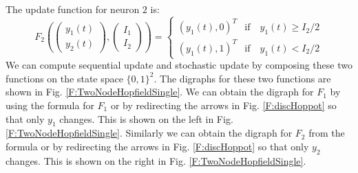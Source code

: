    The update function for neuron $2$ is:
\begin{equation}\label{E:hopexam1}
F_2
\left(
\begin{pmatrix}
y_1(t) \\ y_2(t)
\end{pmatrix},
\begin{pmatrix}
I_1 \\ I_2
\end{pmatrix}
\right)
=
\left\{
\begin{array}{ll}
(y_1(t),0)^T & \mbox{if} \quad y_1(t) \geq I_2/2 \\
(y_1(t),1)^T & \mbox{if} \quad y_1(t) < I_2/2 
\end{array}\right.
\end{equation}
We can compute sequential update and stochastic update by composing these two 
functions on the state space $\{0,1\}^2$.  The digraphs for these two functions 
are shown in Fig.  \ref{F:TwoNodeHopfieldSingle}.  We can obtain the digraph 
for $F_1$ by using the formula for $F_1$ or by redirecting the arrows in Fig. 
\ref{F:discHoppot} so that only $y_1$ changes.  This is shown on the left in
Fig. \ref{F:TwoNodeHopfieldSingle}.  Similarly we can obtain the digraph for 
$F_2$ from the formula or by redirecting the arrows in Fig. \ref{F:discHoppot} 
so that only $y_2$ changes.  This is shown on the right in Fig.  
\ref{F:TwoNodeHopfieldSingle}.

